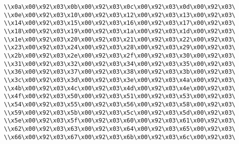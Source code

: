 \verb|\\x0a\x00\x92\x03\x0b\x00\x92\x03\x0c\x00\x92\x03\x0d\x00\x92\x03\|\newline
\verb|\\x0e\x00\x92\x03\x10\x00\x92\x03\x12\x00\x92\x03\x13\x00\x92\x03\|\newline
\verb|\\x14\x00\x92\x03\x15\x00\x92\x03\x16\x00\x92\x03\x17\x00\x92\x03\|\newline
\verb|\\x18\x00\x92\x03\x19\x00\x92\x03\x1a\x00\x92\x03\x1d\x00\x92\x03\|\newline
\verb|\\x1e\x00\x92\x03\x20\x00\x92\x03\x21\x00\x92\x03\x22\x00\x92\x03\|\newline
\verb|\\x23\x00\x92\x03\x24\x00\x92\x03\x28\x00\x92\x03\x29\x00\x92\x03\|\newline
\verb|\\x2b\x00\x92\x03\x2e\x00\x92\x03\x2f\x00\x92\x03\x30\x00\x92\x03\|\newline
\verb|\\x31\x00\x92\x03\x32\x00\x92\x03\x34\x00\x92\x03\x35\x00\x92\x03\|\newline
\verb|\\x36\x00\x92\x03\x37\x00\x92\x03\x38\x00\x92\x03\x3b\x00\x92\x03\|\newline
\verb|\\x3c\x00\x92\x03\x3d\x00\x92\x03\x3e\x00\x92\x03\x4a\x00\x92\x03\|\newline
\verb|\\x4b\x00\x92\x03\x4c\x00\x92\x03\x4d\x00\x92\x03\x4e\x00\x92\x03\|\newline
\verb|\\x4f\x00\x92\x03\x50\x00\x92\x03\x51\x00\x92\x03\x53\x00\x92\x03\|\newline
\verb|\\x54\x00\x92\x03\x55\x00\x92\x03\x56\x00\x92\x03\x58\x00\x92\x03\|\newline
\verb|\\x59\x00\x92\x03\x5b\x00\x92\x03\x5c\x00\x92\x03\x5d\x00\x92\x03\|\newline
\verb|\\x5e\x00\x92\x03\x5f\x00\x92\x03\x60\x00\x92\x03\x61\x00\x92\x03\|\newline
\verb|\\x62\x00\x92\x03\x63\x00\x92\x03\x64\x00\x92\x03\x65\x00\x92\x03\|\newline
\verb|\\x66\x00\x92\x03\x67\x00\x92\x03\x6b\x00\x92\x03\x6c\x00\x92\x03\|\newline
